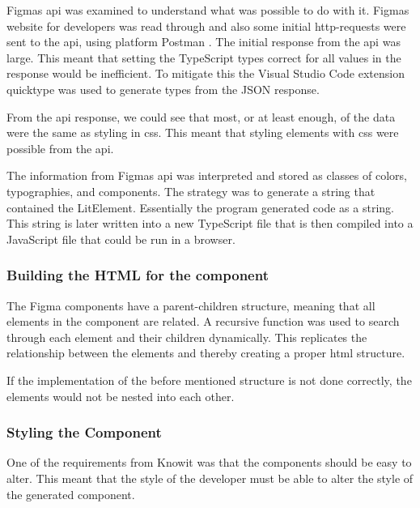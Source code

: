 Figmas \acrshort{api} was examined to understand what was possible to do with it. Figmas website for developers\cite{figmaFigma} was read through and also some initial \acrshort{http}-requests were sent to the \acrshort{api}, using platform Postman \cite{PostmanCollaborationPlatform}. The initial response from the \acrshort{api} was large. This meant that setting the TypeScript types correct for all values in the response would be inefficient. To mitigate this the Visual Studio Code \cite{VisualStudioCode} extension quicktype\cite{ConvertJSONSwift} was used to generate types from the JSON response. 

From the \acrshort{api} response, we could see that most, or at least enough, of the data were the same as styling in \acrshort{css}. This meant that styling elements with \acrshort{css} were possible from the \acrshort{api}.

The information from Figmas \acrshort{api} was interpreted and stored as classes of colors, typographies, and \glspl{component}. The strategy was to generate a string that contained the LitElement. Essentially the program generated code as a string. This string is later written into a new TypeScript file that is then compiled into a JavaScript file that could be run in a browser.

\subsubsection{Building the HTML for the component}%
\label{ssub:building the skeleton of the component}
The Figma \glspl{component} have a parent-children structure, meaning that all \glspl{element} in the \gls{component} are related. A recursive function was used to search through each \gls{element} and their children dynamically. This replicates the relationship between the \glspl{element} and thereby creating a proper \acrshort{html} structure.

If the implementation of the before mentioned structure is not done correctly, the \glspl{element} would not be nested into each other.


\subsubsection{Styling the Component}%
\label{ssub:Styling the component}
One of the requirements from Knowit was that the \glspl{component} should be easy to alter. This meant that the style of the developer must be able to alter the style of the generated \gls{component}. 

